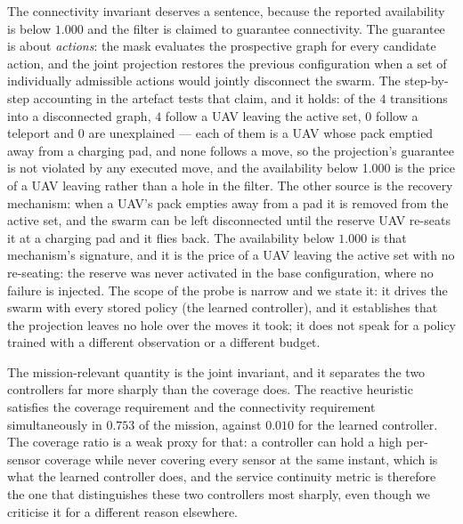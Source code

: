 \documentclass[conference]{IEEEtran}
\begin{document}
The connectivity invariant deserves a sentence, because the reported
availability is below $1.000$ and the filter is claimed to guarantee
connectivity.  The guarantee is about \emph{actions}: the mask evaluates
the prospective graph for every candidate action, and the joint projection
restores the previous configuration when a set of individually admissible
actions would jointly disconnect the swarm.  The step-by-step accounting
in the artefact tests that claim, and it holds: of the $4$
transitions into a disconnected graph, $4$ follow a UAV
leaving the active set, $0$ follow a teleport and
$0$ are unexplained --- each of them is a UAV whose pack emptied away from a charging pad, and none follows a move, so the projection's guarantee is not violated by any executed move, and the availability below 1.000 is the price of a UAV leaving rather than a hole in the filter.
The other source is the recovery mechanism: when a UAV's pack empties away
from a pad it is removed from the active set, and the swarm can be left
disconnected until the reserve UAV re-seats it at a charging pad and it
flies back.  The availability below $1.000$ is that mechanism's signature,
and it is the price of a UAV leaving the active set with no re-seating: the
reserve was never activated in the base configuration, where no failure is
injected.
The scope of the probe is narrow and we state it: it drives the swarm with
every stored policy (the learned controller), and it establishes that the projection leaves no hole over
the moves it took; it does not speak for a policy trained with a different
observation or a different budget.

The mission-relevant quantity is the joint invariant, and it separates
the two controllers far more sharply than the coverage does.  The
reactive heuristic satisfies the coverage requirement and the connectivity requirement simultaneously in $0.753$ of the
mission, against $0.010$ for the learned controller.  The
coverage ratio is a weak proxy for that: a controller can hold a high
per-sensor coverage while never covering every sensor at the same
instant, which is what the learned controller does, and the service
continuity metric is therefore the one that distinguishes these two
controllers most sharply, even though we criticise it for a different
reason elsewhere.
\end{document}
